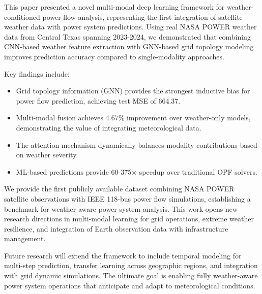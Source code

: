 \documentclass[journal,12pt,onecolumn]{IEEEtran}
\begin{document}
This paper presented a novel multi-modal deep learning framework for weather-conditioned power flow analysis, representing the first integration of satellite weather data with power system predictions. Using real NASA POWER weather data from Central Texas spanning 2023-2024, we demonstrated that combining CNN-based weather feature extraction with GNN-based grid topology modeling improves prediction accuracy compared to single-modality approaches.

Key findings include:
\begin{itemize}
    \item Grid topology information (GNN) provides the strongest inductive bias for power flow prediction, achieving test MSE of 664.37.
    \item Multi-modal fusion achieves 4.67\% improvement over weather-only models, demonstrating the value of integrating meteorological data.
    \item The attention mechanism dynamically balances modality contributions based on weather severity.
    \item ML-based predictions provide 60-375× speedup over traditional OPF solvers.
\end{itemize}

We provide the first publicly available dataset combining NASA POWER satellite observations with IEEE 118-bus power flow simulations, establishing a benchmark for weather-aware power system analysis. This work opens new research directions in multi-modal learning for grid operations, extreme weather resilience, and integration of Earth observation data with infrastructure management.

Future research will extend the framework to include temporal modeling for multi-step prediction, transfer learning across geographic regions, and integration with grid dynamic simulations. The ultimate goal is enabling fully weather-aware power system operations that anticipate and adapt to meteorological conditions.
\end{document}
